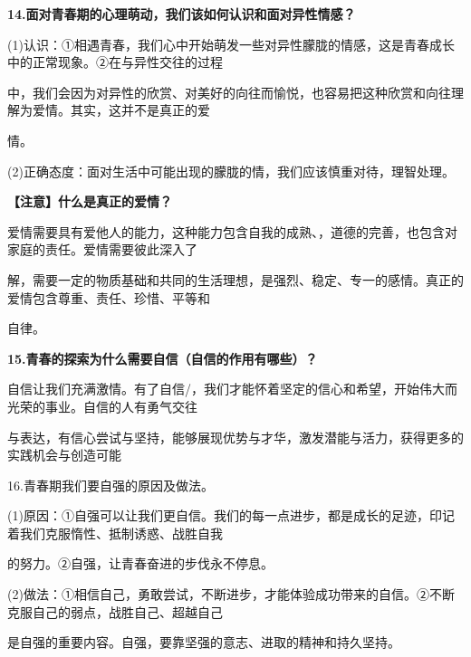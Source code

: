 \documentclass[lang=cn,11pt]{elegantbook}
\newcommand{\daofasym}[1]{{\daofasymbolfont #1}}
\newcommand{\daofasym}[1]{#1}
\begin{document}
\textbf{14.面对青春期的心理萌动，我们该如何认识和面对异性情感？}\par

(1)认识：\daofasym{①}相遇青春，我们心中开始萌发一些对异性朦胧的情感，这是青春成长中的正常现象。\daofasym{②}在与异性交往的过程\par

中，我们会因为对异性的欣赏、对美好的向往而愉悦，也容易把这种欣赏和向往理解为爱情。其实，这并不是真正的爱\par

情。\par

(2)正确态度：面对生活中可能出现的朦胧的情，我们应该慎重对待，理智处理。\par

\textbf{【注意】什么是真正的爱情？}\par

爱情需要具有爱他人的能力，这种能力包含自我的成熟、，道德的完善，也包含对家庭的责任。爱情需要彼此深入了\par

解，需要一定的物质基础和共同的生活理想，是强烈、稳定、专一的感情。真正的爱情包含尊重、责任、珍惜、平等和\par

自律。\par

\textbf{15.青春的探索为什么需要自信（自信的作用有哪些）？}\par

自信让我们充满激情。有了自信/，我们才能怀着坚定的信心和希望，开始伟大而光荣的事业。自信的人有勇气交往\par

与表达，有信心尝试与坚持，能够展现优势与才华，激发潜能与活力，获得更多的实践机会与创造可能\par

16.青春期我们要自强的原因及做法。\par

(1)原因：\daofasym{①}自强可以让我们更自信。我们的每一点进步，都是成长的足迹，印记着我们克服惰性、抵制诱惑、战胜自我\par

的努力。\daofasym{②}自强，让青春奋进的步伐永不停息。\par

(2)做法：\daofasym{①}相信自己，勇敢尝试，不断进步，才能体验成功带来的自信。\daofasym{②}不断克服自己的弱点，战胜自己、超越自己\par

是自强的重要内容。自强，要靠坚强的意志、进取的精神和持久坚持。\par
\end{document}
